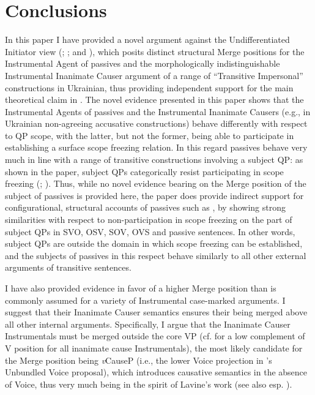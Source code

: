 \documentclass[output=paper,colorlinks,citecolor=brown]{langscibook}
\begin{document}
\section{Conclusions}\label{sec:antonyuk:4}
\largerpage
In this paper I have provided a novel argument against the Undifferentiated Initiator view (\citealt{ant:Ramchand2008}; \citealt{Bruening2013}; \citealt{Legate2014} and \citealt{Wood2017}), which posits distinct structural Merge positions for the Instrumental Agent of passives and the morphologically indistinguishable Instrumental Inanimate Causer argument of a range of “Transitive Impersonal” constructions in Ukrainian, thus providing independent support for the main theoretical claim in \citet{Lavine2022, Lavine2023}. The novel evidence presented in this paper shows that the Instrumental Agents of passives and the Instrumental Inanimate Causers (e.g., in Ukrainian non-agreeing accusative constructions) behave differently with respect to QP scope, with the latter, but not the former, being able to participate in establishing a surface scope freezing relation. In this regard passives behave very much in line with a range of transitive constructions involving a subject QP: as shown in the paper, subject QPs categorically resist participating in scope freezing (\citealt{Larson1990}; \citealt{Bruening2001}). Thus, while no novel evidence bearing on the Merge position of the subject of passives is provided here, the paper does provide indirect support for configurational, structural accounts of passives such as \citet{Collins2005}, by showing strong similarities with respect to non-participation in scope freezing on the part of subject QPs in SVO, OSV, SOV, OVS and passive sentences. In other words, subject QPs are outside the domain in which scope freezing can be established, and the subjects of passives in this respect behave similarly to all other external arguments of transitive sentences.

I have also provided evidence in favor of a higher Merge position than is commonly assumed for a variety of Instrumental case-marked arguments. I suggest that their Inanimate Causer semantics ensures their being merged above all other internal arguments. Specifically, I argue that the Inanimate Causer Instrumentals must be merged outside the core VP (cf. \citealt{Lavine2022,Lavine2023} for a low complement of V position for all inanimate cause Instrumentals), the most likely candidate for the Merge position being \textit{v}CauseP (i.e., the lower Voice projection in \citeauthor{Pylkkänen2002}'s \citeyear{Pylkkänen2002, Pylkkänen2008} Unbundled Voice proposal), which introduces causative semantics in the absence of Voice, thus very much being in the spirit of Lavine’s work (see also esp. \citealt{Harley2013}).
\end{document}
